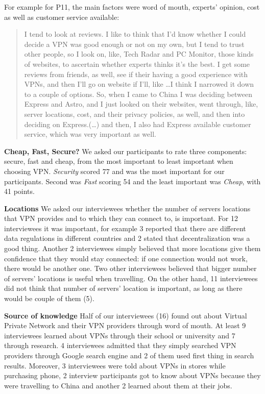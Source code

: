 For example for P11, the main factors were word of mouth, experts’ opinion,
cost as well as customer service available: \begin{quote}I tend to look at
    reviews. I like to think that I'd know whether I could decide a VPN was
    good enough or not on my own, but I tend to trust other people, so I look
    on, like, Tech Radar and PC Monitor, those kinds of websites, to ascertain
    whether experts thinks it's the best. I get some reviews from friends, as
    well, see if their having a good experience with VPNs, and then I'll go on
    website if I'll, like \dots I think I narrowed it down to a couple of
    options. So, when I came to China I was deciding between Express and
    Astro, and I just looked on their websites, went through, like, server
    locations, cost, and their privacy policies, as well, and then into
    deciding on Express.(\dots) and then, I also had Express available
customer service, which was very important as well.\end{quote}

\textbf{Cheap, Fast, Secure?} We asked our participants to rate three
components: secure, fast and cheap, from the most important to least important
when choosing VPN. \textit{Security} scored 77 and was the most important for
our participants. Second was \textit{Fast} scoring 54 and the least important
was \textit{Cheap}, with 41 points.


\textbf{Locations} We asked our interviewees whether the number of servers
locations that VPN provides and to which they can connect to, is important.
For 12 interviewees it was important, for example 3 reported that there are
different data regulations in different countries and 2 stated that
decentralization was a good thing. Another 2 interviewees simply believed that
more locations give them confidence that they would stay connected: if one
connection would not work, there would be another one. Two other interviewees
believed that bigger number of servers’ locations is useful when travelling.
On the other hand, 11 interviewees did not think that number of servers’
location is important, as long as there would be couple of them (5).  

\textbf{Source of knowledge} Half of our interviewees (16) found out about
Virtual Private Network and their VPN providers through word of mouth. At
least 9 interviewees learned about VPNs through their school or university and
7 through research. 4 interviewees admitted that they simply searched VPN
providers through Google search engine and 2 of them used first thing in
search results. Moreover, 3 interviewees were told about VPNs in stores while
purchasing phone, 2 interview participants got to know about VPNs because they
were travelling to China and another 2 learned about them at their jobs.


